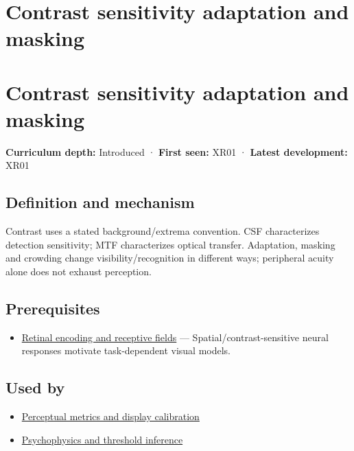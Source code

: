 \hypertarget{appendix-b3aa9e8e01ad}{}
\section*{Contrast sensitivity adaptation and masking}
\section{Contrast sensitivity adaptation and masking}\label{appendix-b3aa9e8e01ad-contrast-sensitivity-adaptation-and-masking}

\textbf{Curriculum depth:} Introduced · \textbf{First seen:} XR01 · \textbf{Latest development:} XR01

\subsection{Definition and mechanism}\label{appendix-b3aa9e8e01ad-definition-and-mechanism}

Contrast uses a stated background/extrema convention. CSF characterizes detection sensitivity; MTF characterizes optical transfer. Adaptation, masking and crowding change visibility/recognition in different ways; peripheral acuity alone does not exhaust perception.

\subsection{Prerequisites}\label{appendix-b3aa9e8e01ad-prerequisites}

\begin{itemize}
\tightlist
\item
  \hyperref[appendix-7281c15ac44a]{Retinal encoding and receptive fields} --- Spatial/contrast-sensitive neural responses motivate task-dependent visual models.
\end{itemize}

\subsection{Used by}\label{appendix-b3aa9e8e01ad-used-by}

\begin{itemize}
\tightlist
\item
  \hyperref[appendix-b2c1846508bf]{Perceptual metrics and display calibration}
\item
  \hyperref[appendix-1759f03e8ce7]{Psychophysics and threshold inference}
\end{itemize}


